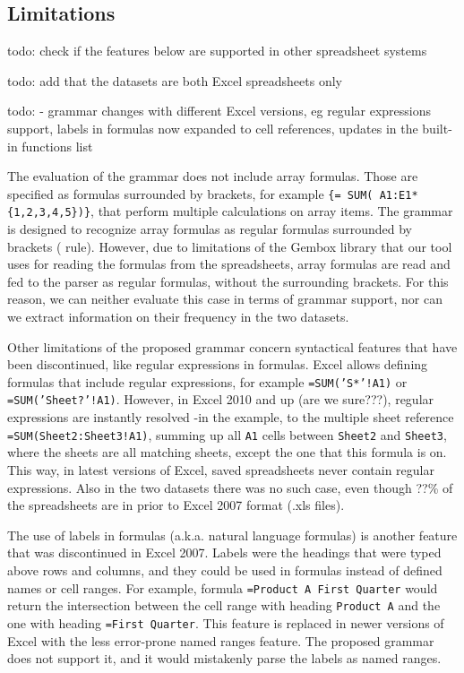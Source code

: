 \documentclass[conference]{IEEEtran}
\begin{document}
\subsection{Limitations}
todo: check if the features below are supported in other spreadsheet systems

todo: add that the datasets are both Excel spreadsheets only

todo: - grammar changes with different Excel versions, eg regular expressions support, labels in formulas now expanded to cell
references, updates in the built-in functions list

The evaluation of the grammar does not include array formulas. Those are specified as formulas surrounded by brackets, for example \texttt{\{= SUM( A1:E1*\{1,2,3,4,5\})\}}, that perform multiple calculations on array items. The grammar is designed to recognize array formulas as regular formulas surrounded by brackets ( rule). However, due to limitations of the Gembox library that our tool uses for reading the formulas from the spreadsheets, array formulas are read and fed to the parser as regular formulas, without the surrounding brackets. For this reason, we can neither evaluate this case in terms of grammar support, nor can we extract information on their frequency in the two datasets.

Other limitations of the proposed grammar concern syntactical features that have been discontinued, like regular expressions in formulas. Excel allows defining formulas that include regular expressions, for example \texttt{=SUM('S*'!A1)} or \texttt{=SUM('Sheet?'!A1)}. However, in Excel 2010 and up (are we sure???), regular expressions are instantly resolved -in the example, to the multiple sheet reference \texttt{=SUM(Sheet2:Sheet3!A1)}, summing up all \texttt{A1} cells between \texttt{Sheet2} and \texttt{Sheet3}, where the sheets are all matching sheets, except the one that this formula is on. This way, in latest versions of Excel, saved spreadsheets never contain regular expressions. Also in the two datasets there was no such case, even though ??\% of the spreadsheets are in prior to Excel 2007 format (.xls files). 

The use of labels in formulas (a.k.a. natural language formulas) is another feature that was discontinued in Excel 2007. Labels were the headings that were typed above rows and columns, and they could be used in formulas instead of defined names or cell ranges. For example, formula \texttt{=Product A First Quarter} would return the intersection between the cell range with heading \texttt{Product A} and the one with heading \texttt{=First Quarter}. This feature is replaced in newer versions of Excel with the less error-prone named ranges feature. The proposed grammar does not support it, and it would mistakenly parse the labels as named ranges.
\end{document}

